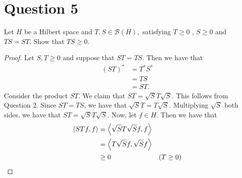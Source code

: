 \section{Question 5}
\horz

Let $H$ be a Hilbert space and $T, S\in \mathcal B(H),$ satisfying $T\geqslant 0$ , $S\geqslant 0$ and $TS=ST.$  Show that $TS \geqslant 0.$

\horz

\begin{proof}
    Let $S, T \ge 0$ and suppose that $ST=TS$. Then we have that
    \begin{align*}
	\left( ST \right)^{*} &= T^{*}S^{*} \\
	&= TS \\
	&= ST.
    \end{align*}
    Consider the product $ST$. We claim that $ST= \sqrt{S}T\sqrt{S}$. This follows from Question 2. Since $ST=TS$, we have that $\sqrt{S}T= T\sqrt{S}$. Multiplying $\sqrt{S}$ both sides, we have that $ST=\sqrt{S}T\sqrt{S}$. Now, let $f\in H$. Then we have that
    \begin{align*}
	\left\langle STf,f \right\rangle &= \left\langle \sqrt{S}T\sqrt{S}f,f \right\rangle \\
	&= \left\langle T\sqrt{S}f, \sqrt{S}f \right\rangle \\ 
	&\ge 0 & (T\ge 0)
    \end{align*}
\end{proof}
